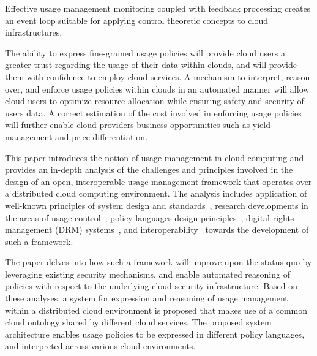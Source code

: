 \documentclass[times, 10pt,twocolumn]{article}
\begin{document}
Effective usage management monitoring coupled with feedback processing creates an event loop suitable for applying control theoretic concepts to cloud infrastructures.

The ability to express fine-grained usage policies will provide cloud users a greater trust regarding the usage of their data within clouds, and will provide them with confidence to employ cloud services. A mechanism to interpret, reason over, and enforce usage policies within clouds in an automated manner will allow cloud users to optimize resource allocation while ensuring safety and security of users data. A correct estimation of the cost involved in enforcing usage policies will further enable cloud providers business opportunities such as yield management and price differentiation.

This paper introduces the notion of usage management in cloud computing and provides an in-depth analysis of the challenges and principles involved in the design of an open, interoperable usage management framework that operates over a distributed cloud computing environment. The analysis includes application of well-known principles of system design and standards~\cite{BlCl:01,Cl:88,ClWrSoBr:02}, research developments in the areas of usage control~\cite{PaSa:04,JaHeLa:10}, policy languages design principles~\cite{JaHeMa:06}, digital rights management (DRM) systems~\cite{JaHe:09},  and interoperability~\cite{JaHe:04,HeJa:05,KoLaMaMi:04,coral,marlin} towards the development of such a framework.

The paper delves into how such a framework will improve upon the status quo by leveraging  existing security mechanisms, and enable automated reasoning of policies with respect to the underlying cloud security infrastructure. Based on these analyses, a system for expression and reasoning of usage management within a distributed cloud environment is proposed that makes use of a common cloud ontology shared by different cloud services. The proposed system architecture enables usage policies to be expressed in different policy languages, and interpreted across various cloud environments. 

\end{document}
